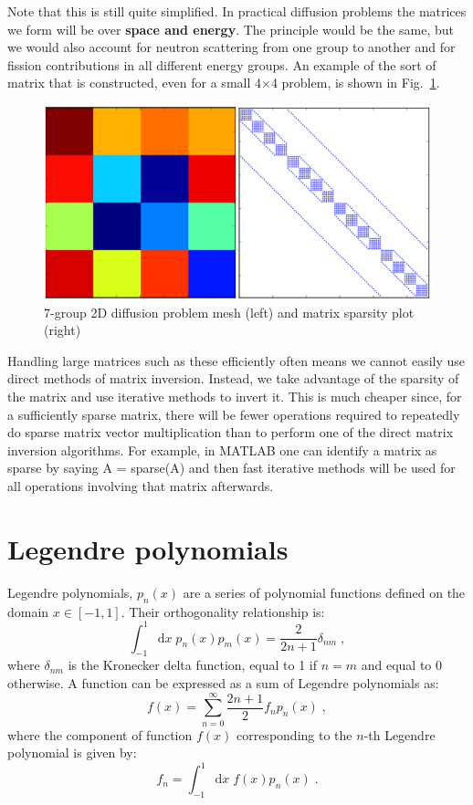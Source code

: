 \documentclass{article}
\begin{document}
Note that this is still quite simplified. In practical diffusion problems the matrices we form will be over \textbf{space and energy}. The principle would be the same, but we would also account for neutron scattering from one group to another and for fission contributions in all different energy groups. An example of the sort of matrix that is constructed, even for a small 4$\times$4 problem, is shown in Fig.~\ref{fig:matrix}.

\begin{figure}[h]
    \centering
    \includegraphics[width=0.6\linewidth]{./matrix.png}
    \caption{7-group 2D diffusion problem mesh (left) and matrix sparsity plot (right) \cite{openmoc}}
    \label{fig:matrix}
\end{figure}

Handling large matrices such as these efficiently often means we cannot easily use direct methods of matrix inversion. Instead, we take advantage of the sparsity of the matrix and use iterative methods to invert it. This is much cheaper since, for a sufficiently sparse matrix, there will be fewer operations required to repeatedly do sparse matrix vector multiplication than to perform one of the direct matrix inversion algorithms. For example, in MATLAB one can identify a matrix as sparse by saying {\selectfont A = sparse(A)} and then fast iterative methods will be used for all operations involving that matrix afterwards.

\printbibliography

\appendix

\section{Legendre polynomials}\label{appendix:legendre}

Legendre polynomials, $p_n(x)$ are a series of polynomial functions defined on the domain $x\in[-1,1]$. Their orthogonality relationship is:
\begin{equation}
    \int^1_{-1}\mathrm{d}x\; p_n(x) p_m(x) = \frac{2}{2n+1}\delta_{nm}\;\mathrm{,}
\end{equation}
where $\delta_{nm}$ is the Kronecker delta function, equal to 1 if $n=m$ and equal to 0 otherwise. A function can be expressed as a sum of Legendre polynomials as:
\begin{equation}
    f(x) = \sum^\infty_{n=0}\frac{2n+1}{2}f_n p_n(x)\;\mathrm{,}
\end{equation}
where the component of function $f(x)$ corresponding to the $n$-th Legendre polynomial is given by:
\begin{equation}
    f_n = \int^1_{-1}\mathrm{d}x\; f(x) p_n(x)\;\mathrm{.}
\end{equation}
\end{document}
